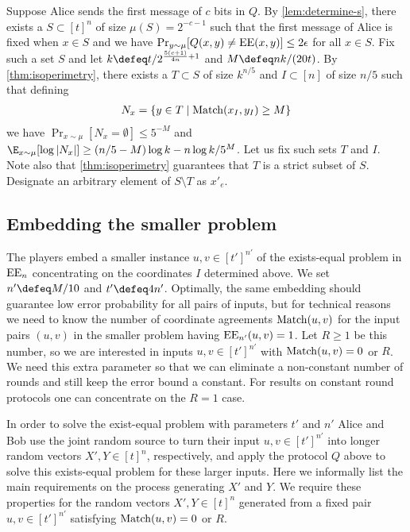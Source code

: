 Suppose Alice sends the first message of $c$ bits in $Q$. By
\autoref{lem:determine-s}, there exists a $S\subset [t]^n$ of
size $\mu(S)=2^{-c-1}$ such that the first message of Alice is
fixed when $x\in S$ and we have $\Pr_{y\sim
\mu}[Q(x,y)\neq\operatorname{EE}(x,y)]\leq 2\epsilon$ for all $x\in S$. Fix
such a set $S$ and let $k\defeq t/2^{\frac{5(c+1)}{4n} + 1}$ and
$M \defeq nk/(20t)$. By \autoref{thm:isoperimetry}, there exists
a $T\subset S$ of size $k^{n/5}$ and $I\subset[n]$ of size $n/5$
such that defining
\begin{align*}
N_x=\{y\in T\mid\operatorname{Match}(x_I,y_I)\ge M\}
\end{align*}
we have $\Pr_{x\sim\mu}[N_x=\emptyset] \le 5^{-M}$ and
$\E_{x\sim \mu}[\log|N_x|]\geq (n/5-M)\log k - n\log k /5^M$.
Let us fix such sets $T$ and $I$. Note also that
\autoref{thm:isoperimetry} guarantees that $T$ is a strict
subset of $S$. Designate an arbitrary element of $S\setminus T$
as $x'_e$.

\subsection{Embedding the smaller problem}
\label{sec:embed}
The players embed a smaller instance $u,v\in[t']^{n'}$ of the
exists-equal problem in $\operatorname{EE}_n$ concentrating on the coordinates
$I$ determined above. We set $n'\defeq M/10$ and $t'\defeq4n'$.
Optimally, the same embedding should guarantee low error
probability for all pairs of inputs, but for technical reasons
we need to know the number of coordinate agreements
$\operatorname{Match}(u,v)$ for the input pairs $(u,v)$ in the smaller problem
having $\operatorname{EE}_{n'}(u,v)=1$. Let $R\ge1$ be this number, so we are
interested in inputs $u,v\in[t']^{n'}$ with $\operatorname{Match}(u,v)=0$ or
$R$. We need this extra parameter so that we can eliminate a
non-constant number of rounds and still keep the error bound a
constant. For results on constant round protocols one can
concentrate on the $R=1$ case.

In order to solve the exist-equal problem with parameters $t'$
and $n'$ Alice and Bob use the joint random source to turn their
input $u,v\in[t']^{n'}$ into longer random vectors
$X',Y\in[t]^n$, respectively, and apply the protocol $Q$ above
to solve this exists-equal problem for these larger inputs. Here
we informally list the main requirements on the process
generating $X'$ and $Y$. We require these properties for the
random vectors $X',Y\in[t]^n$ generated from a fixed pair
$u,v\in[t']^{n'}$ satisfying $\operatorname{Match}(u,v)=0$ or $R$.

